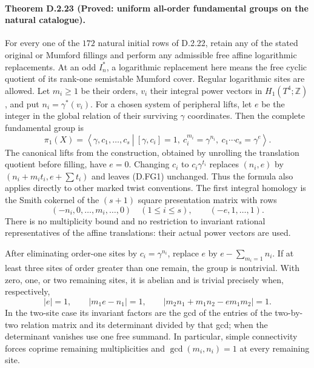 \paragraph{Theorem D.2.23 (Proved: uniform all-order fundamental groups on the natural catalogue).}
For every one of the $172$ natural initial rows of D.2.22, retain any
of the stated original or Mumford fillings and perform any admissible
free affine logarithmic replacements. At an odd $I_n^*$, a logarithmic
replacement here means the free cyclic quotient of its rank-one
semistable Mumford cover. Regular logarithmic sites are allowed.
Let $m_i\ge1$ be their orders, $v_i$ their integral power vectors in
$H_1(T^4;\mathbb Z)$, and put $n_i=\gamma^*(v_i)$.
For a chosen system of peripheral lifts, let $e$ be the integer in
the global relation of their surviving $\gamma$ coordinates.
Then the complete fundamental group is
\[
 \pi_1(X)=\left\langle \gamma,c_1,\ldots,c_s\ \left|\
 [\gamma,c_i]=1,\ c_i^{m_i}=\gamma^{n_i},\
 c_1\cdots c_s=\gamma^e\right.\right\rangle .                 \tag{D.FG1}
\]
The canonical lifts from the construction, obtained by unrolling the
translation quotient before filling, have $e=0$. Changing $c_i$ to
$c_i\gamma^{t_i}$ replaces $(n_i,e)$ by
$(n_i+m_it_i,e+\sum t_i)$ and leaves (D.FG1) unchanged.
Thus the formula also applies directly to other marked twist conventions.
The first integral homology is the Smith cokernel of the $(s+1)$ square
presentation matrix with rows
\[
 (-n_i,0,\ldots,m_i,\ldots,0)\quad(1\le i\le s),
 \qquad (-e,1,\ldots,1).                                    \tag{D.FG2}
\]
There is no multiplicity bound and no restriction to invariant rational
representatives of the affine translations: their actual power vectors
are used.

After eliminating order-one sites by $c_i=\gamma^{n_i}$, replace $e$
by $e-\sum_{m_i=1}n_i$. If at least three sites of order greater than
one remain, the group is nontrivial. With zero, one, or two remaining
sites, it is abelian and is trivial precisely when, respectively,
\[
 |e|=1,\qquad |m_1e-n_1|=1,\qquad
 |m_2n_1+m_1n_2-em_1m_2|=1.                                \tag{D.FG3}
\]
In the two-site case its invariant factors are the gcd of the entries
of the two-by-two relation matrix and its determinant divided by that
gcd; when the determinant vanishes use one free summand. In particular,
simple connectivity forces coprime remaining multiplicities and
$\gcd(m_i,n_i)=1$ at every remaining site.

